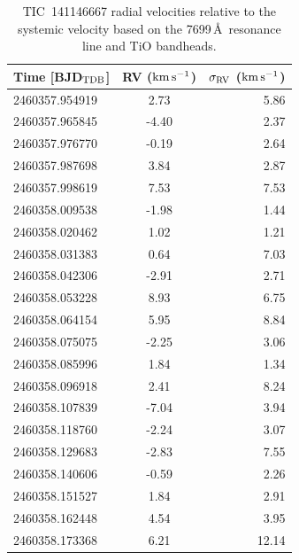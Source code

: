 \documentclass{nature3}
\newcommand{\kms}{\ensuremath{\rm km\,s^{-1}}}
\begin{document}
\begin{methods}
\begin{table}
  \centering
  \begin{tabular}{lcr}
  \hline 
  \hline 
  Time [BJD$_{\rm TDB}$] & RV (\kms) & $\sigma_{\rm RV}$ (\kms) \\
  \hline 
  2460357.954919 & 2.73 & 5.86 \\
  2460357.965845 & -4.40 & 2.37 \\
  2460357.976770 & -0.19 & 2.64 \\
  2460357.987698 & 3.84 & 2.87 \\
  2460357.998619 & 7.53 & 7.53 \\
  2460358.009538 & -1.98 & 1.44 \\
  2460358.020462 & 1.02 & 1.21 \\
  2460358.031383 & 0.64 & 7.03 \\
  2460358.042306 & -2.91 & 2.71 \\
  2460358.053228 & 8.93 & 6.75 \\
  2460358.064154 & 5.95 & 8.84 \\
  2460358.075075 & -2.25 & 3.06 \\
  2460358.085996 & 1.84 & 1.34 \\
  2460358.096918 & 2.41 & 8.24 \\
  2460358.107839 & -7.04 & 3.94 \\
  2460358.118760 & -2.24 & 3.07 \\
  2460358.129683 & -2.83 & 7.55 \\
  2460358.140606 & -0.59 & 2.26 \\
  2460358.151527 & 1.84 & 2.91 \\
  2460358.162448 & 4.54 & 3.95 \\
  2460358.173368 & 6.21 & 12.14 \\
  \hline
  \end{tabular}
  \caption{TIC~141146667 radial velocities relative to the systemic
  velocity based on the 7699\,\AA\ resonance line and TiO bandheads.}
  \label{tab:rv}
\end{table}



\end{methods}
\end{document}

